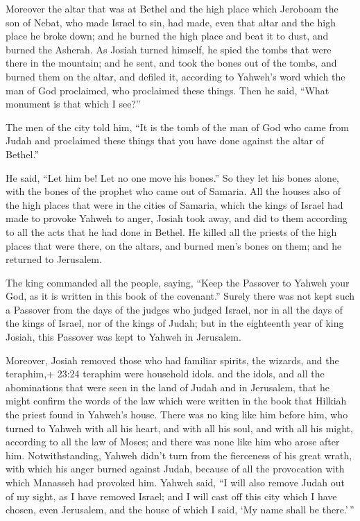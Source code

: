  Moreover the altar that was at Bethel and the high place
which Jeroboam the son of Nebat, who made Israel to sin, had made, even
that altar and the high place he broke down; and he burned the high
place and beat it to dust, and burned the Asherah.  As
Josiah turned himself, he spied the tombs that were there in the
mountain; and he sent, and took the bones out of the tombs, and burned
them on the altar, and defiled it, according to Yahweh's word which the
man of God proclaimed, who proclaimed these things.  Then
he said, ``What monument is that which I see?''

The men of the city told him, ``It is the tomb of the man of God who
came from Judah and proclaimed these things that you have done against
the altar of Bethel.''

 He said, ``Let him be! Let no one move his bones.'' So
they let his bones alone, with the bones of the prophet who came out of
Samaria.  All the houses also of the high places that were
in the cities of Samaria, which the kings of Israel had made to provoke
Yahweh to anger, Josiah took away, and did to them according to all the
acts that he had done in Bethel.  He killed all the priests
of the high places that were there, on the altars, and burned men's
bones on them; and he returned to Jerusalem.

 The king commanded all the people, saying, ``Keep the
Passover to Yahweh your God, as it is written in this book of the
covenant.''  Surely there was not kept such a Passover from
the days of the judges who judged Israel, nor in all the days of the
kings of Israel, nor of the kings of Judah;  but in the
eighteenth year of king Josiah, this Passover was kept to Yahweh in
Jerusalem.

 Moreover, Josiah removed those who had familiar spirits,
the wizards, and the teraphim,+ 23:24 teraphim were household idols. and
the idols, and all the abominations that were seen in the land of Judah
and in Jerusalem, that he might confirm the words of the law which were
written in the book that Hilkiah the priest found in Yahweh's house.
 There was no king like him before him, who turned to
Yahweh with all his heart, and with all his soul, and with all his
might, according to all the law of Moses; and there was none like him
who arose after him.  Notwithstanding, Yahweh didn't turn
from the fierceness of his great wrath, with which his anger burned
against Judah, because of all the provocation with which Manasseh had
provoked him.  Yahweh said, ``I will also remove Judah out
of my sight, as I have removed Israel; and I will cast off this city
which I have chosen, even Jerusalem, and the house of which I said, `My
name shall be there.'\,''

